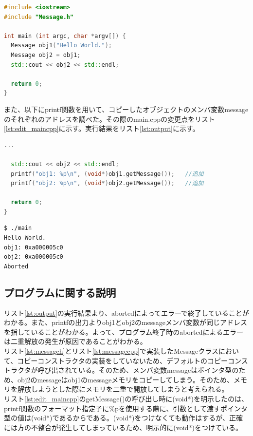 \documentclass[paper=a4,fontsize=11pt]{jlreq}
\begin{document}
\begin{lstlisting}[language=C++, caption=main.cpp, label=lst:maincpp]
#include <iostream>
#include "Message.h"

int main (int argc, char *argv[]) {
  Message obj1("Hello World.");
  Message obj2 = obj1;
  std::cout << obj2 << std::endl;

  return 0;
}
\end{lstlisting}


また、以下にprintf関数を用いて、コピーしたオブジェクトのメンバ変数messageのそれぞれのアドレスを調べた。その際のmain.cppの変更点をリスト\ref{lst:edit_maincpp}に示す。実行結果をリスト\ref{lst:output}に示す。

\begin{lstlisting}[language=C++, caption=main.cpp (アドレス確認用), label=lst:edit_maincpp]
...

  std::cout << obj2 << std::endl;
  printf("obj1: %p\n", (void*)obj1.getMessage());   //追加
  printf("obj2: %p\n", (void*)obj2.getMessage());   //追加

  return 0;
}
\end{lstlisting}

\begin{lstlisting}[language=bash, caption=実行結果, label=lst:output]
$ ./main
Hello World.
obj1: 0xa000005c0
obj2: 0xa000005c0
Aborted
\end{lstlisting}

\subsection{プログラムに関する説明}

リスト\ref{lst:output}の実行結果より、abortedによってエラーで終了していることがわかる。また、printfの出力よりobj1とobj2のmessageメンバ変数が同じアドレスを指していることがわかる。よって、プログラム終了時のabortedによるエラーは二重解放の発生が原因であることがわかる。\\
リスト\ref{lst:messageh}とリスト\ref{lst:messagecpp}で実装したMessageクラスにおいて、コピーコンストラクタの実装をしていないため、デフォルトのコピーコンストラクタが呼び出されている。そのため、メンバ変数messageはポインタ型のため、obj2のmessageはobj1のmessageメモリをコピーしてしまう。そのため、メモリを解放しようとした際にメモリを二重で開放してしまうと考えられる。\\

リスト\ref{lst:edit_maincpp}のgetMessage()の呼び出し時に(void*)を明示したのは、printf関数のフォーマット指定子に\%pを使用する際に、引数として渡すポインタ型の値は(void*)であるからである。(void*)をつけなくても動作はするが、正確には方の不整合が発生してしまっているため、明示的に(void*)をつけている。
\end{document}
